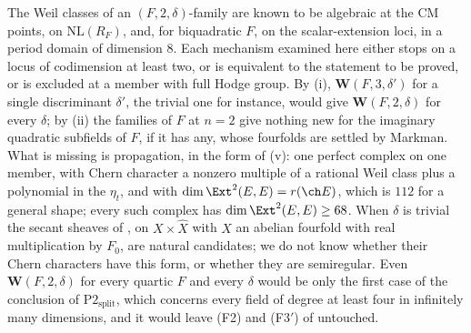 \begin{remark}[What is missing at $n=2$]\label{rem:quarticgap}
The Weil classes of an $(F,2,\delta)$-family are known to be algebraic at the
CM points, on $\mathrm{NL}(R_{F})$, and, for biquadratic $F$, on the
scalar-extension loci, in a period domain of dimension $8$. Each mechanism
examined here either stops on a locus of codimension at least two, or is
equivalent to the statement to be proved, or is excluded at a member with
full Hodge group. By (i), $\mathbf{W}(F,3,\delta')$ for a
single discriminant $\delta'$, the trivial one for instance, would give
$\mathbf{W}(F,2,\delta)$ for every $\delta$; by (ii) the
families of $F$ at $n=2$ give nothing new for the imaginary quadratic subfields
of $F$, if it has any, whose fourfolds are settled by Markman. What is missing
is propagation, in the form of (v): one perfect
complex on one member, with Chern character a nonzero multiple of a rational
Weil class plus a polynomial in the $\eta_{t}$, and with
$\dim\Ext^{2}(E,E)=r(\ch E)$, which is $112$ for a general shape; every such
complex has $\dim\Ext^{2}(E,E)\ge68$. When $\delta$ is trivial the secant
sheaves of \cite{Mar25c}, on $X\times\widehat{X}$ with $X$ an abelian fourfold
with real multiplication by $F_{0}$, are natural candidates; we do not know
whether their Chern characters have this form, or whether they are
semiregular. Even $\mathbf{W}(F,2,\delta)$ for every quartic $F$ and every
$\delta$ would be only the first case of the conclusion of
$\mathrm{P2}_{\mathrm{split}}$, which concerns every field of degree at least
four in infinitely many dimensions, and it would leave (F2) and (F3$'$) of
 untouched.
\end{remark}
